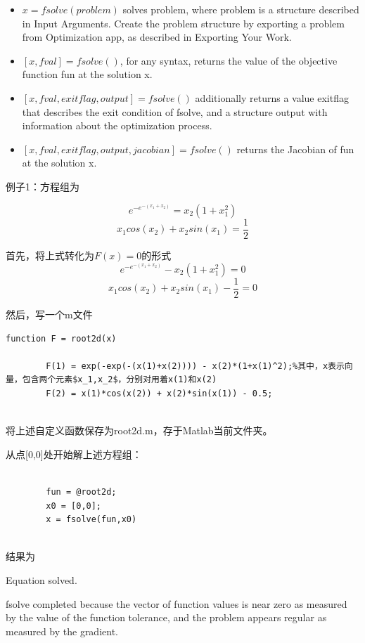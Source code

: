 \documentclass[cn,10pt,math=newtx,citestyle=gb7714-2015,bibstyle=gb7714-2015]{elegantbook}
\begin{document}
{{\begin{itemize}
		\item $x = fsolve(problem)$ solves problem, where problem is a structure described in Input Arguments. Create the problem structure by exporting a problem from Optimization app, as described in Exporting Your Work.
		
		\item $[x,fval] = fsolve()$, for any syntax, returns the value of the objective function fun at the solution x.
		
		
		\item $[x,fval,exitflag,output] = fsolve()$ additionally returns a value exitflag that describes the exit condition of fsolve, and a structure output with information about the optimization process.
		
		\item $[x,fval,exitflag,output,jacobian] = fsolve()$ returns the Jacobian of fun at the solution x.
		
		
	\end{itemize}
	
	例子1：方程组为
	
	$$e^{-e^{-(x_1+x_2)}}=x_2(1+x_1^2)$$
	$$x_1cos(x_2)+x_2sin(x_1)=\frac{1}{2}$$
	
	首先，将上式转化为$F(x)=0$的形式
	$$e^{-e^{-(x_1+x_2)}}-x_2(1+x_1^2)=0$$
	$$x_1cos(x_2)+x_2sin(x_1)-\frac{1}{2}=0$$
	
	然后，写一个m文件
	\begin{lstlisting}[frame=shadowbox]
		function F = root2d(x)
		
		F(1) = exp(-exp(-(x(1)+x(2)))) - x(2)*(1+x(1)^2);%其中，x表示向量，包含两个元素$x_1,x_2$，分别对用着x(1)和x(2)
		F(2) = x(1)*cos(x(2)) + x(2)*sin(x(1)) - 0.5;
		
	\end{lstlisting}
	
	将上述自定义函数保存为root2d.m，存于Matlab当前文件夹。
	
	从点[0,0]处开始解上述方程组：
	\begin{lstlisting}[frame=shadowbox]
		
		fun = @root2d;
		x0 = [0,0];
		x = fsolve(fun,x0)
		
	\end{lstlisting}
	
	结果为
	
	Equation solved.
	
	fsolve completed because the vector of function values is near zero as measured by the value of the function tolerance, and
	the problem appears regular as measured by the gradient.
	
}}
\end{document}
